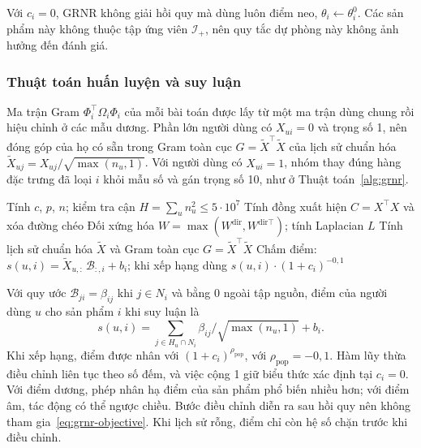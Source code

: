 Với $c_i=0$, GRNR không giải hồi quy mà dùng luôn điểm neo, $\theta_i\leftarrow\theta_i^0$. Các sản phẩm này không thuộc tập ứng viên $\mathcal{I}_+$, nên quy tắc dự phòng này không ảnh hưởng đến đánh giá.

\subsubsection{Thuật toán huấn luyện và suy luận}
\label{sec:grnr-algorithm}

Ma trận Gram $\Phi_i^\top\Omega_i\Phi_i$ của mỗi bài toán được lấy từ một ma trận dùng chung rồi hiệu chỉnh ở các mẫu dương. Phần lớn người dùng có $X_{ui}=0$ và trọng số 1, nên đóng góp của họ có sẵn trong Gram toàn cục $G=\tilde X^\top\tilde X$ của lịch sử chuẩn hóa $\tilde X_{uj}=X_{uj}/\sqrt{\max(n_u,1)}$. Với người dùng có $X_{ui}=1$, nhóm thay đúng hàng đặc trưng đã loại $i$ khỏi mẫu số và gán trọng số 10, như ở Thuật toán~\ref{alg:grnr}.

\begin{algorithm}[H]
\caption{Huấn luyện và chấm điểm GRNR}
\label{alg:grnr}
Tính $c$, $p$, $n$; kiểm tra cận $H=\sum_u n_u^2\le5\cdot10^7$\;
Tính đồng xuất hiện $C=X^\top X$ và xóa đường chéo\;
Đối xứng hóa $W=\max(W^{\mathrm{dir}},W^{\mathrm{dir}\top})$; tính Laplacian $L$\;
Tính lịch sử chuẩn hóa $\tilde X$ và Gram toàn cục $G=\tilde X^\top\tilde X$\;
Chấm điểm: $s(u,i)=\tilde X_{u,:}\,\mathcal{B}_{:,i}+b_i$; khi xếp hạng dùng $s(u,i)\cdot(1+c_i)^{-0{,}1}$\;
\end{algorithm}

Với quy ước $\mathcal{B}_{ji}=\beta_{ij}$ khi $j\in N_i$ và bằng 0 ngoài tập nguồn, điểm của người dùng $u$ cho sản phẩm $i$ khi suy luận là
\begin{equation}
s(u,i)=\sum_{j\in H_u\cap N_i}\beta_{ij}/\sqrt{\max(n_u,1)}+b_i.
\end{equation}
Khi xếp hạng, điểm được nhân với $(1+c_i)^{\rho_{\mathrm{pop}}}$, với $\rho_{\mathrm{pop}}=-0{,}1$. Hàm lũy thừa điều chỉnh liên tục theo số đếm, và việc cộng 1 giữ biểu thức xác định tại $c_i=0$. Với điểm dương, phép nhân hạ điểm của sản phẩm phổ biến nhiều hơn; với điểm âm, tác động có thể ngược chiều. Bước điều chỉnh diễn ra sau hồi quy nên không tham gia~\eqref{eq:grnr-objective}. Khi lịch sử rỗng, điểm chỉ còn hệ số chặn trước khi điều chỉnh.

